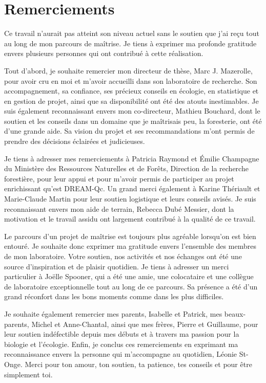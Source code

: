 \chapter*{Remerciements}        %
\label{chap-remerciements}      %


 Ce travail n'aurait pas atteint son niveau actuel sans le soutien que j'ai reçu tout au long de mon parcours de maîtrise. 
 Je tiens à exprimer ma profonde gratitude envers plusieurs personnes qui ont contribué à cette réalisation.

 Tout d'abord, je souhaite remercier mon directeur de thèse, Marc J. Mazerolle, pour avoir cru en moi et m'avoir accueilli dans son laboratoire de recherche. 
 Son accompagnement, sa confiance, ses précieux conseils en écologie, en statistique et en gestion de projet, ainsi que sa disponibilité ont été des atouts inestimables. 
 Je suis également reconnaissant envers mon co-directeur, Mathieu Bouchard, dont le soutien et les conseils dans un domaine que je maîtrisais peu, la foresterie, ont été d'une grande aide. 
 Sa vision du projet et ses recommandations m'ont permis de prendre des décisions éclairées et judicieuses.

 Je tiens à adresser mes remerciements à Patricia Raymond et Émilie Champagne du Ministère des Ressources Naturelles et de Forêts, Direction de la recherche forestière, 
 pour leur appui et pour m'avoir permis de participer au projet enrichissant qu'est DREAM-Qc. 
 Un grand merci également à Karine Thériault et Marie-Claude Martin pour leur soutien logistique et leurs conseils avisés. 
 Je suis reconnaissant envers mon aide de terrain, Rebecca Dubé Messier, dont la motivation et le travail assidu ont largement contribué à la qualité de ce travail.

 Le parcours d'un projet de maîtrise est toujours plus agréable lorsqu'on est bien entouré. 
 Je souhaite donc exprimer ma gratitude envers l'ensemble des membres de mon laboratoire. 
 Votre soutien, nos activités et nos échanges ont été une source d'inspiration et de plaisir quotidien. 
 Je tiens à adresser un merci particulier à Joëlle Spooner, qui a été une amie, une colocataire et une collègue de laboratoire exceptionnelle tout au long de ce parcours. 
 Sa présence a été d'un grand réconfort dans les bons moments comme dans les plus difficiles.

 Je souhaite également remercier mes parents, Isabelle et Patrick, mes beaux-parents, Michel et Anne-Chantal, ainsi que mes frères, Pierre et Guillaume, pour leur soutien indéfectible depuis mes débuts et à travers ma passion pour la biologie et l'écologie. 
 Enfin, je conclus ces remerciements en exprimant ma reconnaissance envers la personne qui m'accompagne au quotidien, Léonie St-Onge. 
 Merci pour ton amour, ton soutien, ta patience, tes conseils et pour être simplement toi.


